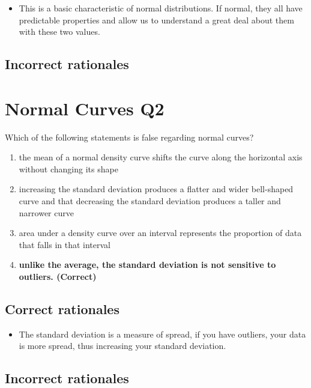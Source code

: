 \documentclass[letterpaper,9pt,twoside,printwatermark=false]{pinp}
\providecommand{\tightlist}{%
  \setlength{\itemsep}{0pt}\setlength{\parskip}{0pt}}
\begin{document}
\begin{itemize}
\tightlist
\item
  This is a basic characteristic of normal distributions. If normal,
  they all have predictable properties and allow us to understand a
  great deal about them with these two values.
\end{itemize}

\hypertarget{incorrect-rationales-5}{%
\subsection{Incorrect rationales}\label{incorrect-rationales-5}}

\hypertarget{normal-curves-q2}{%
\section{Normal Curves Q2}\label{normal-curves-q2}}

Which of the following statements is false regarding normal curves?

\begin{enumerate}
\def\labelenumi{\alph{enumi})}
\tightlist
\item
  the mean of a normal density curve shifts the curve along the
  horizontal axis without changing its shape
\item
  increasing the standard deviation produces a flatter and wider
  bell-shaped curve and that decreasing the standard deviation produces
  a taller and narrower curve
\item
  area under a density curve over an interval represents the proportion
  of data that falls in that interval
\item
  \textbf{unlike the average, the standard deviation is not sensitive to
  outliers. (Correct)}
\end{enumerate}

\hypertarget{correct-rationales-6}{%
\subsection{Correct rationales}\label{correct-rationales-6}}

\begin{itemize}
\tightlist
\item
  The standard deviation is a measure of spread, if you have outliers,
  your data is more spread, thus increasing your standard deviation.
\end{itemize}

\hypertarget{incorrect-rationales-6}{%
\subsection{Incorrect rationales}\label{incorrect-rationales-6}}





\end{document}
